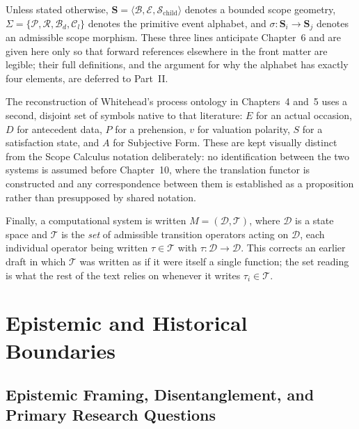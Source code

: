 \documentclass[11pt,twoside,openright]{book}
\numberwithin{equation}{chapter}
\theoremstyle{definition}
\theoremstyle{plain}
\theoremstyle{remark}
\theoremstyle{definition}
\newcommand{\Scope}{\mathbf{S}}
\newcommand{\ScopeMorph}{\sigma}
\newcommand{\Alphabet}{\Sigma}
\newcommand{\Pop}{\mathcal{P}}
\newcommand{\Refuse}{\mathcal{R}}
\newcommand{\Bind}{\mathcal{B}_d}
\newcommand{\Collapse}{\mathcal{C}_l}
\newcommand{\ScopeAlphabet}{\Alphabet=\{\Pop,\Refuse,\Bind,\Collapse\}}
\newcommand{\Boundary}{\mathcal{B}}
\newcommand{\Interior}{\mathcal{E}}
\newcommand{\Children}{\mathcal{S}_{\mathrm{child}}}
\newcommand{\Domain}{\mathcal{D}}
\newcommand{\Trans}{\mathcal{T}}
\newcommand{\WData}{D}
\newcommand{\WPrehensions}{P}
\newcommand{\WValuation}{v}
\newcommand{\WSatisfaction}{S}
\newcommand{\WSubjForm}{A}
\newcommand{\WOccasion}{E}
\begin{document}
Unless stated otherwise, $\Scope=\langle\Boundary,\Interior,\Children\rangle$
denotes a bounded scope geometry, $\ScopeAlphabet$ denotes the primitive
event alphabet, and $\ScopeMorph:\Scope_i\to\Scope_j$ denotes an admissible
scope morphism. These three lines anticipate Chapter~6 and are given here
only so that forward references elsewhere in the front matter are legible;
their full definitions, and the argument for why the alphabet has exactly
four elements, are deferred to Part~II.

The reconstruction of Whitehead's process ontology in Chapters~4 and~5
uses a second, disjoint set of symbols native to that literature: $\WOccasion$
for an actual occasion, $\WData$ for antecedent data, $\WPrehensions$ for a
prehension, $\WValuation$ for valuation polarity, $\WSatisfaction$ for a
satisfaction state, and $\WSubjForm$ for Subjective Form. These are kept
visually distinct from the Scope Calculus notation deliberately: no
identification between the two systems is assumed before Chapter~10, where
the translation functor is constructed and any correspondence between them
is established as a proposition rather than presupposed by shared notation.

Finally, a computational system is written $M=(\Domain,\Trans)$, where
$\Domain$ is a state space and $\Trans$ is the \emph{set} of admissible
transition operators acting on $\Domain$, each individual operator being
written $\tau\in\Trans$ with $\tau:\Domain\to\Domain$. This corrects an
earlier draft in which $\Trans$ was written as if it were itself a single
function; the set reading is what the rest of the text relies on whenever
it writes $\tau_i\in\Trans$.

\mainmatter

\part{Epistemic and Historical Boundaries}

\chapter{Epistemic Framing, Disentanglement, and Primary Research Questions}
\label{ch:epistemic-framing}
\end{document}
